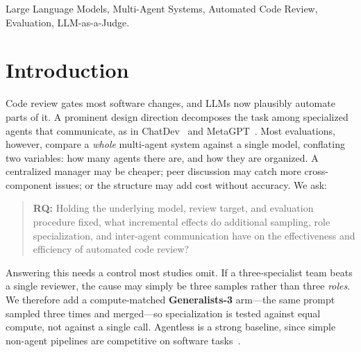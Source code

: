 \documentclass[conference]{IEEEtran}
\begin{document}
\begin{IEEEkeywords}
Large Language Models, Multi-Agent Systems, Automated Code Review, Evaluation,
LLM-as-a-Judge.
\end{IEEEkeywords}

\section{Introduction}

Code review gates most software changes, and LLMs now plausibly automate parts
of it. A prominent design direction decomposes the task among specialized agents
that communicate, as in ChatDev~\cite{chatdev} and MetaGPT~\cite{metagpt}. Most
evaluations, however, compare a \emph{whole} multi-agent system against a single
model, conflating two variables: how many agents there are, and how they are
organized. A centralized manager may be cheaper; peer discussion may catch more
cross-component issues; or the structure may add cost without accuracy. We ask:

\begin{quote}
\textbf{RQ:} Holding the underlying model, review target, and evaluation
procedure fixed, what incremental effects do additional sampling, role
specialization, and inter-agent communication have on the effectiveness and
efficiency of automated code review?
\end{quote}

Answering this needs a control most studies omit. If a three-specialist team beats
a single reviewer, the cause may simply be three samples rather than three
\emph{roles}. We therefore add a compute-matched \textbf{Generalists-3} arm---the
same prompt sampled three times and merged---so specialization is tested against
equal compute, not against a single call. Agentless is a strong baseline, since
simple non-agent pipelines are competitive on software tasks~\cite{agentless}.
\end{document}
